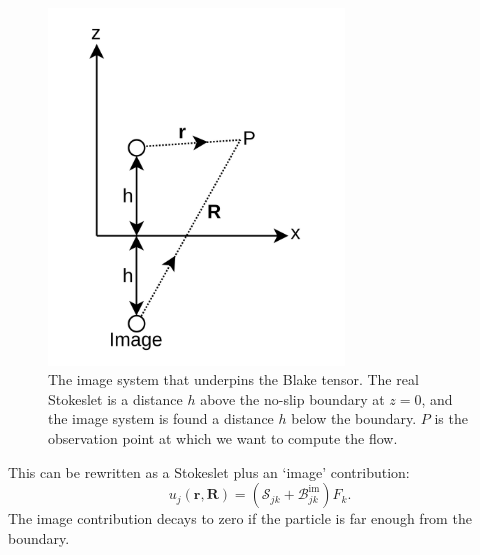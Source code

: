 \begin{figure}
    \centering
    \includegraphics[width=0.7\textwidth]{images_other/blake_reproduction.png}
    \caption{The image system that underpins the Blake tensor. The real Stokeslet is a distance $h$ above the no-slip boundary at $z=0$, and the image system is found a distance $h$ below the boundary. $P$ is the observation point at which we want to compute the flow.}
    \label{fig:blake_image_system}
\end{figure}

This can be rewritten as a Stokeslet plus an `image' contribution:
\begin{equation}
    u_j(\mathbf{r}, \mathbf{R}) = (\mathcal{S}_{jk} + \mathcal{B}^\text{im}_{jk}) F_k.
\end{equation}
The image contribution decays to zero if the particle is far enough from the boundary.

